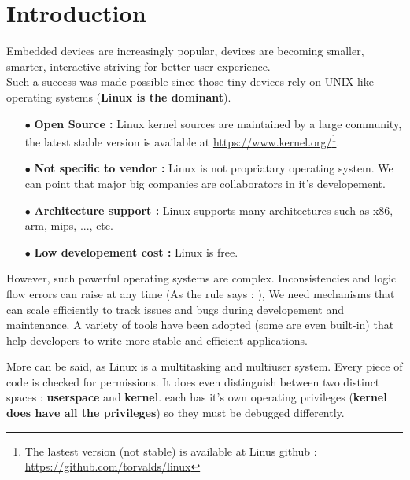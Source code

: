 \section{Introduction}
{\Large Embedded devices are increasingly popular, devices are becoming smaller, smarter, interactive striving for better user experience.\\

Such a success was made possible since those tiny devices rely on UNIX-like operating systems (\textbf{Linux is the dominant}). 

\begin{itemize}
	\item[$\bullet$] \textbf{Open Source : } Linux kernel sources are maintained by a large community, the latest stable version is available at {\color{blue}\url{https://www.kernel.org/}}\footnote{The lastest version (not stable) is available at Linus github : {\color{blue}\url{https://github.com/torvalds/linux}}}.
	
	\item[$\bullet$] \textbf{Not specific to vendor : } Linux is not propriatary operating system. We can point that major big companies are collaborators in it's developement.
	
	\item[$\bullet$] \textbf{Architecture support : } Linux supports many architectures such as x86, arm, mips, ..., etc.
	
	\item[$\bullet$] \textbf{Low developement cost : } Linux is free. 
\end{itemize}

\vspace{10px}

However, such powerful operating systems are complex. Inconsistencies and logic flow errors can raise at any time (As the rule says :  \fg),
We need mechanisms that can scale efficiently to track issues and bugs during developement and maintenance. A variety of tools have been adopted (some are even built-in) that help developers to write more stable and efficient applications.\\

\vspace{10px}

More can be said, as Linux is a multitasking and multiuser system. Every piece of code is checked for permissions. It
does even distinguish between two distinct spaces : \textbf{userspace} and \textbf{kernel}. each has it's own operating privileges (\textbf{kernel does have all the privileges}) so they must be debugged differently.

}